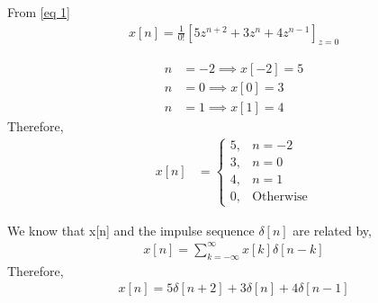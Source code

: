 \documentclass{beamer}
\providecommand{\sbrak}[1]{\ensuremath{{}\left[#1\right]}}
\begin{document}
\begin{frame}{}
From \eqref{eq 1}
    \begin{align}
  x[n] = \frac{1}{0!}\sbrak{5z^{n+2} + 3z^n + 4z^{n-1}}_{z=0}
\end{align}

\begin{align}
    n &= -2 \implies x[-2] = 5\\ 
    n &= 0 \implies x[0] = 3\\
    n &= 1 \implies x[1] = 4
\end{align}
Therefore,
\begin{align}
    x[n] &= 
 \begin{cases}
 5, & n = -2\\
 3, & n = 0\\
 4, &  n = 1\\
 0, & \text{Otherwise}
 \end{cases}
\end{align} \label{eq 12}
\end{frame}

\begin{frame}{}
    We know that x[n] and the impulse sequence $\delta[n]$ are related by,
\begin{align}
    x[n] = \sum_{k=-\infty}^{\infty} x[k]\delta[n-k]
\end{align}
Therefore,
\begin{align}
    x[n] = 5\delta[n+2] + 3\delta[n] + 4\delta[n-1]
\end{align}

\end{frame}
\end{document}
